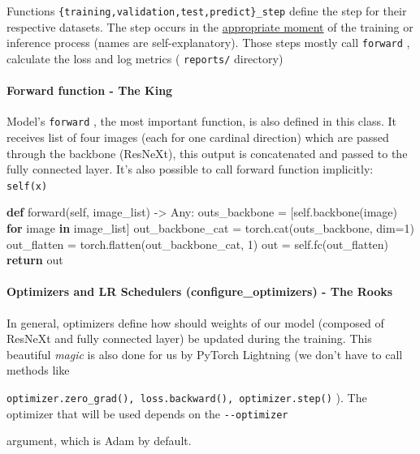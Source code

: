 \documentclass[]{article}
\newenvironment{Shaded}{\begin{snugshade}}{\end{snugshade}}
\newcommand{\ControlFlowTok}[1]{\textcolor[rgb]{0.26,0.66,0.93}{\textbf{#1}}}
\newcommand{\DecValTok}[1]{\textcolor[rgb]{0.27,0.67,0.26}{#1}}
\newcommand{\KeywordTok}[1]{\textcolor[rgb]{0.26,0.66,0.93}{\textbf{#1}}}
\newcommand{\NormalTok}[1]{\textcolor[rgb]{0.74,0.68,0.62}{#1}}
\newcommand{\OperatorTok}[1]{\textcolor[rgb]{0.74,0.68,0.62}{#1}}
\newcommand{\VariableTok}[1]{\textcolor[rgb]{0.74,0.68,0.62}{#1}}
\let\oldparagraph\paragraph
\renewcommand{\paragraph}[1]{\oldparagraph{#1}\mbox{}}
\let\oldtexttt\texttt
\renewcommand{\texttt}[1]{
  \textcolor{tcolor}{\colorbox{bgcolor}{\oldtexttt{#1}}}
}
\begin{document}
Functions \texttt{\{training,validation,test,predict\}\_step} define the
step for their respective datasets. The step occurs in the
\href{https://pytorch-lightning.readthedocs.io/en/stable/common/lightning_module.html\#hooks}{appropriate
moment} of the training or inference process (names are
self-explanatory). Those steps mostly call \texttt{forward}, calculate
the loss and log metrics (\texttt{reports/} directory)

\hypertarget{forward-function---the-king}{%
\paragraph{Forward function - The
King}\label{forward-function---the-king}}

Model's \texttt{forward}, the most important function, is also defined
in this class. It receives list of four images (each for one cardinal
direction) which are passed through the backbone (ResNeXt), this output
is concatenated and passed to the fully connected layer. It's also
possible to call forward function implicitly: \texttt{self(x)}

\begin{Shaded}
\begin{Highlighting}[]
\KeywordTok{def}\NormalTok{ forward(}\VariableTok{self}\NormalTok{, image_list) }\OperatorTok{->}\NormalTok{ Any:}
\NormalTok{   outs_backbone }\OperatorTok{=}\NormalTok{ [}\VariableTok{self}\NormalTok{.backbone(image) }\ControlFlowTok{for}\NormalTok{ image }\KeywordTok{in}\NormalTok{ image_list]}
\NormalTok{   out_backbone_cat }\OperatorTok{=}\NormalTok{ torch.cat(outs_backbone, dim}\OperatorTok{=}\DecValTok{1}\NormalTok{)}
\NormalTok{   out_flatten }\OperatorTok{=}\NormalTok{ torch.flatten(out_backbone_cat, }\DecValTok{1}\NormalTok{)}
\NormalTok{   out }\OperatorTok{=} \VariableTok{self}\NormalTok{.fc(out_flatten)}
   \ControlFlowTok{return}\NormalTok{ out}
\end{Highlighting}
\end{Shaded}

\hypertarget{optimizers-and-lr-schedulers-configure_optimizers---the-rooks}{%
\paragraph{Optimizers and LR Schedulers (configure\_optimizers) - The
Rooks}\label{optimizers-and-lr-schedulers-configure_optimizers---the-rooks}}

In general, optimizers define how should weights of our model (composed
of ResNeXt and fully connected layer) be updated during the training.
This beautiful \emph{magic} is also done for us by PyTorch Lightning (we
don't have to call methods like
\texttt{optimizer.zero\_grad(),\ loss.backward(),\ optimizer.step()}).
The optimizer that will be used depends on the \texttt{-\/-optimizer}
argument, which is Adam by default.
\end{document}
